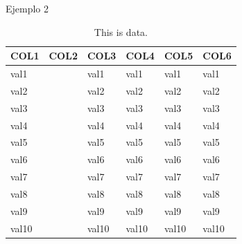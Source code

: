 \documentclass[
]{article}
\begin{document}
Ejemplo 2

\begin{table}

\caption{\label{tab:unnamed-chunk-12}This is data.}
\centering
\fontsize{16}{18}\selectfont
\begin{tabu} to 
\hline
COL1 & COL2 & COL3 & COL4 & COL5 & COL6\\
\hline
val1 &  & val1 & val1 & val1 & val1\\
\hline
val2 &  & val2 & val2 & val2 & val2\\
\hline
val3 &  & val3 & val3 & val3 & val3\\
\hline
val4 &  & val4 & val4 & val4 & val4\\
\hline
val5 &  & val5 & val5 & val5 & val5\\
\hline
val6 &  & val6 & val6 & val6 & val6\\
\hline
val7 &  & val7 & val7 & val7 & val7\\
\hline
val8 &  & val8 & val8 & val8 & val8\\
\hline
val9 &  & val9 & val9 & val9 & val9\\
\hline
val10 &  & val10 & val10 & val10 & val10\\
\hline
\end{tabu}
\end{table}
\end{document}

